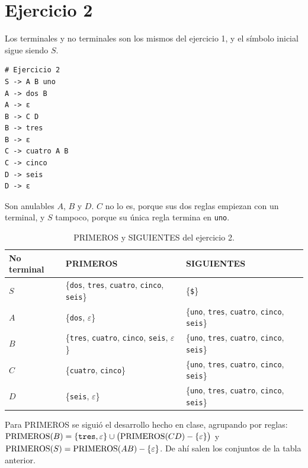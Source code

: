 \documentclass[12pt,letterpaper]{article}
\newcommand{\tk}[1]{\texttt{#1}}
\newcommand{\prim}{\textup{PRIMEROS}}
\begin{document}
\section{Ejercicio 2}

Los terminales y no terminales son los mismos del ejercicio 1, y el símbolo inicial sigue siendo $S$.

\noindent\begin{minipage}{\linewidth}
\begin{lstlisting}[caption={\texttt{grammars/gramatica2.txt}.}]
# Ejercicio 2
S -> A B uno
A -> dos B
A -> ε
B -> C D
B -> tres
B -> ε
C -> cuatro A B
C -> cinco
D -> seis
D -> ε
\end{lstlisting}
\end{minipage}

Son anulables $A$, $B$ y $D$. $C$ no lo es, porque sus dos reglas empiezan con un terminal, y $S$ tampoco, porque su única regla termina en \tk{uno}.

\begin{table}[H]
\centering
\caption{PRIMEROS y SIGUIENTES del ejercicio 2.}
\small
\begin{tabular}{lll}
\toprule
No terminal & PRIMEROS & SIGUIENTES \\
\midrule
$S$ & \{\texttt{dos}, \texttt{tres}, \texttt{cuatro}, \texttt{cinco}, \texttt{seis}\} & \{\texttt{\$}\} \\
$A$ & \{\texttt{dos}, $\varepsilon$\} & \{\texttt{uno}, \texttt{tres}, \texttt{cuatro}, \texttt{cinco}, \texttt{seis}\} \\
$B$ & \{\texttt{tres}, \texttt{cuatro}, \texttt{cinco}, \texttt{seis}, $\varepsilon$\} & \{\texttt{uno}, \texttt{tres}, \texttt{cuatro}, \texttt{cinco}, \texttt{seis}\} \\
$C$ & \{\texttt{cuatro}, \texttt{cinco}\} & \{\texttt{uno}, \texttt{tres}, \texttt{cuatro}, \texttt{cinco}, \texttt{seis}\} \\
$D$ & \{\texttt{seis}, $\varepsilon$\} & \{\texttt{uno}, \texttt{tres}, \texttt{cuatro}, \texttt{cinco}, \texttt{seis}\} \\
\bottomrule
\end{tabular}
\end{table}

Para PRIMEROS se siguió el desarrollo hecho en clase, agrupando por reglas: $\prim(B) = \{\tk{tres}, \varepsilon\} \cup \big(\prim(CD) - \{\varepsilon\}\big)$ y $\prim(S) = \prim(AB) - \{\varepsilon\}$. De ahí salen los conjuntos de la tabla anterior.
\end{document}
